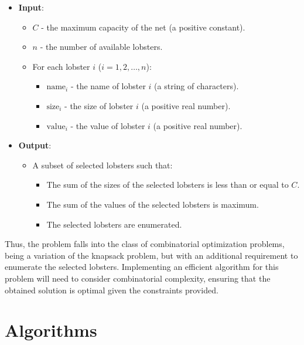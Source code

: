 \documentclass[a4paper,12pt]{article}
\begin{document}
\begin{itemize}
    \item \textbf{Input}:
    \begin{itemize}
        \item \( C \) - the maximum capacity of the net (a positive constant).
        \item \( n \) - the number of available lobsters.
        \item For each lobster \( i \) (\( i = 1, 2, \ldots, n \)):
        \begin{itemize}
            \item \( \text{name}_i \) - the name of lobster \( i \) (a string of characters).
            \item \( \text{size}_i \) - the size of lobster \( i \) (a positive real number).
            \item \( \text{value}_i \) - the value of lobster \( i \) (a positive real number).
        \end{itemize}
    \end{itemize}
    \item \textbf{Output}:
    \begin{itemize}
        \item A subset of selected lobsters such that:
        \begin{itemize}
            \item The sum of the sizes of the selected lobsters is less than or equal to \( C \).
            \item The sum of the values of the selected lobsters is maximum.
            \item The selected lobsters are enumerated.
        \end{itemize}
    \end{itemize}
\end{itemize}

Thus, the problem falls into the class of combinatorial optimization problems, being a variation of the knapsack problem, but with an additional requirement to enumerate the selected lobsters. Implementing an efficient algorithm for this problem will need to consider combinatorial complexity, ensuring that the obtained solution is optimal given the constraints provided.

\section{Algorithms}
\end{document}
